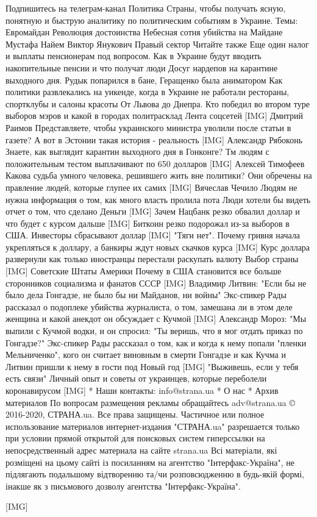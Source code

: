 Подпишитесь на телеграм-канал Политика Страны, чтобы получать ясную,
понятную и быструю аналитику по политическим событиям в Украине.
Темы: Евромайдан  Революция достоинства  Небесная сотня  убийства на
Майдане  Мустафа Найем  Виктор Янукович  Правый сектор
Читайте также
Еще один налог и выплаты пенсионерам под вопросом. Как в Украине будут
вводить накопительные пенсии и что получат люди
Досуг нардепов на карантине выходного дня. Рудык попарился в бане,
Геращенко была аниматором
Как политики развлекались на уикенде, когда в Украине не работали
рестораны, спортклубы и салоны красоты
От Львова до Днепра. Кто победил во втором туре выборов мэров и какой в
городах политрасклад
Лента соцсетей
[IMG]
Дмитрий Раимов
Представляете, чтобы украинского министра уволили после статьи в газете?
А вот в Эстонии такая история - реальность
[IMG]
Александр Рябоконь
Знаете, как выглядит карантин выходного дня в Гонконге?
Тм людям с положительным тестом выплачивают по 650 долларов
[IMG]
Алексей Тимофеев
Какова судьба умного человека, решившего жить вне политики?
Они обречены на правление людей, которые глупее их самих
[IMG]
Вячеслав Чечило
Людям не нужна информация о том, как много власть пролила пота
Люди хотели бы видеть отчет о том, что сделано
Деньги
[IMG]
Зачем Нацбанк резко обвалил доллар и что будет с курсом дальше
[IMG]
Биткоин резко подорожал из-за выборов в США. Инвесторы сбрасывают доллар
[IMG]
"Тяги нет". Почему гривня начала укрепляться к доллару, а банкиры ждут
новых скачков курса
[IMG]
Курс доллара развернули как только иностранцы перестали раскупать валюту
Выбор страны
[IMG]
Советские Штаты Америки
Почему в США становится все больше сторонников социализма и фанатов СССР
[IMG]
Владимир Литвин: "Если бы не было дела Гонгадзе, не было бы ни Майданов,
ни войны"
Экс-спикер Рады рассказал о подоплеке убийства журналиста, о том, замешана
ли в этом деле женщина и какой анекдот он обсуждает с Кучмой
[IMG]
Александр Мороз: "Мы выпили с Кучмой водки, и он спросил: "Ты веришь, что
я мог отдать приказ по Гонгадзе?"
Экс-спикер Рады рассказал о том, как и когда к нему попали "пленки
Мельниченко", кого он считает виновным в смерти Гонгадзе и как Кучма и
Литвин пришли к нему в гости под Новый год
[IMG]
"Выживешь, если у тебя есть связи"
Личный опыт и советы от украинцев, которые переболели коронавирусом
[IMG]
* Наши контакты: info@strana.ua
* О нас
* Архив материалов
По вопросам размещения рекламы обращайтесь adv@strana.ua
© 2016-2020, СТРАНА.ua. Все права защищены.
Частичное или полное использование материалов интернет-издания "СТРАНА.ua"
разрешается только при условии прямой открытой для поисковых систем
гиперссылки на непосредственный адрес материала на сайте strana.ua
Всі матеріали, які розміщені на цьому сайті із посиланням на агентство
"Інтерфакс-Україна", не підлягають подальшому відтворенню та/чи
розповсюдженню в будь-якій формі, інакше як з письмового дозволу агентства
"Інтерфакс-Україна".

[IMG] 
